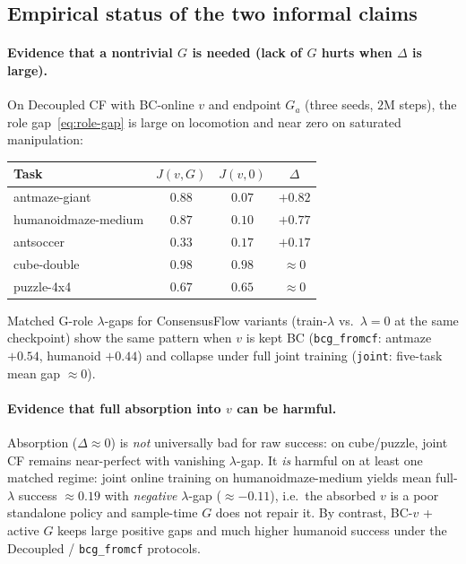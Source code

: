 \subsection{Empirical status of the two informal claims}
\label{subsec:vg-empirical}

\paragraph{Evidence that a nontrivial $G$ is needed (lack of $G$ hurts when $\Delta$ is large).}
On Decoupled CF with BC-online $v$ and endpoint $G_a$ (three seeds, $2$M steps),
the role gap~\eqref{eq:role-gap} is large on locomotion and near zero on saturated
manipulation:

\begin{center}
\begin{tabular}{@{}lccc@{}}
\toprule
Task & $J(v,G)$ & $J(v,0)$ & $\Delta$ \\
\midrule
antmaze-giant & $0.88$ & $0.07$ & $+0.82$ \\
humanoidmaze-medium & $0.87$ & $0.10$ & $+0.77$ \\
antsoccer & $0.33$ & $0.17$ & $+0.17$ \\
cube-double & $0.98$ & $0.98$ & $\approx 0$ \\
puzzle-4x4 & $0.67$ & $0.65$ & $\approx 0$ \\
\bottomrule
\end{tabular}
\end{center}

Matched G-role $\lambda$-gaps for ConsensusFlow variants (train-$\lambda$ vs.\
$\lambda{=}0$ at the same checkpoint) show the same pattern when $v$ is kept BC
(\texttt{bcg\_fromcf}: antmaze $+0.54$, humanoid $+0.44$) and collapse under full
joint training (\texttt{joint}: five-task mean gap $\approx 0$).

\paragraph{Evidence that full absorption into $v$ can be harmful.}
Absorption ($\Delta\!\approx\!0$) is \emph{not} universally bad for raw success:
on cube/puzzle, joint CF remains near-perfect with vanishing $\lambda$-gap.
It \emph{is} harmful on at least one matched regime: joint online training on
humanoidmaze-medium yields mean full-$\lambda$ success $\approx 0.19$ with
\emph{negative} $\lambda$-gap ($\approx -0.11$), i.e.\ the absorbed $v$ is a poor
standalone policy and sample-time $G$ does not repair it.
By contrast, BC-$v$ + active $G$ keeps large positive gaps and much higher
humanoid success under the Decoupled / \texttt{bcg\_fromcf} protocols.


